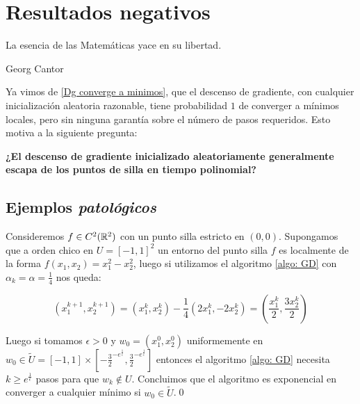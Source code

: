 \chapter{Resultados negativos}\label{ch:resultadosNegativos}

\epigraph{La esencia de las Matem\'aticas yace en su libertad.}{Georg Cantor}

Ya vimos de \ref{Dg converge a minimos}, que el descenso de gradiente, con cualquier inicialización aleatoria razonable, tiene probabilidad $1$ de converger a m\'inimos locales, pero sin ninguna garantía sobre el número de pasos requeridos. Esto motiva a la siguiente
pregunta:

\textbf{¿El descenso de gradiente inicializado aleatoriamente generalmente escapa de los puntos de silla en tiempo polinomial?}

\section{Ejemplos \textit{patol\'ogicos}}

\begin{example}
	Consideremos $f \in C^2({\mathbb{R}}^2)$ con un punto silla estricto en $(0,0)$. Supongamos que a orden chico en $U = [-1,1]^2$ un entorno del punto silla $f$ es localmente de la forma $f(x_1, x_2) = x_1^2 - x_2^2$, luego si utilizamos el algoritmo \ref{algo: GD} con $\alpha_k = \alpha = \frac{1}{4}$ nos queda:
	
	\begin{equation*}
		\left(x_1^{k+1}, x^{k+1}_2\right) = \left(x^k_1, x^k_2\right)- \frac{1}{4} \left(2x^k_1, -2x^k_2\right) = \left(\frac{x^k_1}{2}, \frac{3 x^k_2}{2}\right)
	\end{equation*}
	
	Luego si tomamos $\epsilon >0$ y $w_0 = (x_1^0, x_2^0)$ uniformemente en $w_0\in \widetilde{U} = [-1,1] \times \left[- \frac{3}{2}^{-e^{\frac{1}{\epsilon}}}, \frac{3}{2}^{-e^{\frac{1}{\epsilon}}}\right]$ entonces el algoritmo \ref{algo: GD} necesita $k \geq e^{\frac{1}{\epsilon}}$ pasos para que $w_k \not \in U$. Concluimos que el algoritmo es exponencial en converger a cualquier m\'inimo si $w_0 \in \widetilde{U}$.\qed 
	
\end{example}

